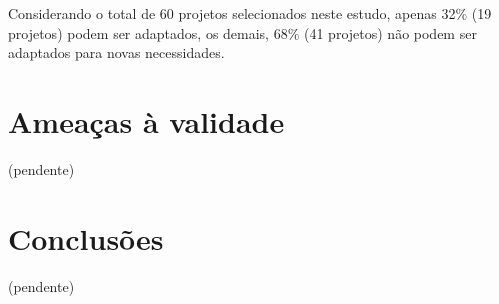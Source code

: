 Considerando o total de 60 projetos selecionados neste estudo, apenas 32\% (19
projetos) podem ser adaptados, os demais, 68\% (41 projetos) não podem ser
adaptados para novas necessidades.

\section{Ameaças à validade}

(pendente)


\section{Conclusões} \label{estudo1:conclusoes}

(pendente)







